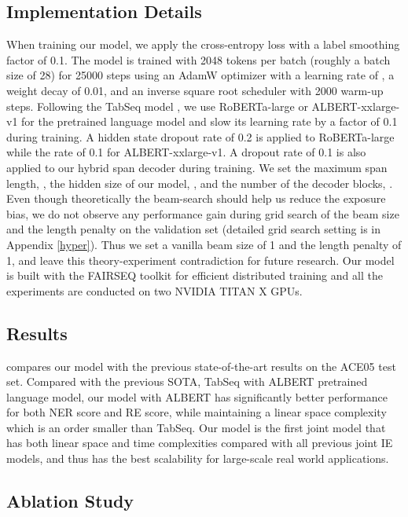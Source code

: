 \documentclass[11pt,a4paper]{article}
\begin{document}
\subsection{Implementation Details}
When training our model, we apply the cross-entropy loss with a label smoothing factor of 0.1. The model is trained with 2048 tokens per batch (roughly a batch size of 28) for 25000 steps using an AdamW optimizer \cite{adamw} with a learning rate of , a weight decay of 0.01, and an inverse square root scheduler with 2000 warm-up steps. Following the TabSeq model \cite{tse}, we use RoBERTa-large \cite{roberta} or ALBERT-xxlarge-v1 \cite{albert} for the pretrained language model and slow its learning rate by a factor of 0.1 during training. A hidden state dropout rate of 0.2 is applied to RoBERTa-large while the rate of 0.1 for  ALBERT-xxlarge-v1. A dropout rate of 0.1 is also applied to our hybrid span decoder during training. We set the maximum span length, , the hidden size of our model, , and the number of the decoder blocks, . Even though theoretically the beam-search should help us reduce the exposure bias, we do not observe any performance gain during grid search of the beam size and the length penalty on the validation set (detailed grid search setting is in Appendix \ref{hyper}). Thus we set a vanilla beam size of 1 and the length penalty of 1, and leave this theory-experiment contradiction for future research. Our model is built with the FAIRSEQ toolkit \cite{ott2019fairseq} for efficient distributed training and all the experiments are conducted on two NVIDIA TITAN X GPUs.


\subsection{Results}

 compares our model with the previous state-of-the-art results on the ACE05 test set. Compared with the previous SOTA, TabSeq \cite{tse} with ALBERT pretrained language model, our model with ALBERT has significantly better performance for both NER score and RE score, while maintaining a linear space complexity which is an order smaller than TabSeq. Our model is the first joint model that has both linear space and time complexities compared with all previous joint IE models, and thus has the best scalability for large-scale real world applications.

\subsection{Ablation Study}
\end{document}
